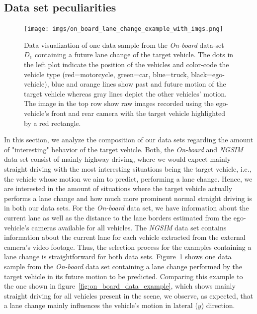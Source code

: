 \subsection{Data set peculiarities}%
\label{subsec:data_set_peculiarities}

\begin{figure}[t]
    \centering
    \texttt{[image: imgs/on\_board\_lane\_change\_example\_with\_imgs.png]}
    \caption{Data visualization of one data sample from the \emph{On-board} data-set $D_1$ containing a future lane change of the target vehicle.
        The dots in the left plot indicate the position of the vehicles and color-code the vehicle type (red=motorcycle, green=car, blue=truck, black=ego-vehicle), blue and orange lines show past and future motion of the target vehicle whereas gray lines depict the other vehicles' motion.
        The image in the top row show raw images recorded using the ego-vehicle's front and rear camera with the target vehicle
    highlighted by a red rectangle.}
    \label{fig:on_board_lane_change_example_with_imgs}
\end{figure}

In this section, we analyze the composition of our data sets regarding the amount of "interesting" behavior of the target vehicle.
Both, the \emph{On-board} and \emph{\ac{NGSIM}} data set consist of mainly highway driving, where we would expect mainly straight driving with the most interesting situations being the target vehicle, i.e., the vehicle whose motion we aim to predict, performing a lane change.
Hence, we are interested in the amount of situations where the target vehicle actually performs a lane change and how much more prominent normal straight driving is in both our data sets.
For the \emph{On-board} data set, we have information about the current lane as well as the distance to the lane borders estimated from the ego-vehicle's cameras available for all vehicles.
The \emph{\ac{NGSIM}} data set contains information about the current lane for each vehicle extracted from the external camera's video footage.
Thus, the selection process for the examples containing a lane change is straightforward for both data sets.
Figure~\ref{fig:on_board_lane_change_example_with_imgs} shows one data sample from the \emph{On-board} data set containing a lane change performed by the target vehicle in its future motion to be predicted.
Comparing this example to the one shown in figure~\ref{fig:on_board_data_example}, which shows mainly straight driving for all vehicles present in the scene, we observe, as expected, that a lane change mainly influences the vehicle's motion in lateral ($y$) direction.

